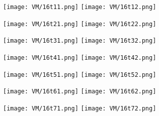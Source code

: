

\begin{figure}[h]
		\centering
		\texttt{[image: VM/16t11.png]}
		\texttt{[image: VM/16t12.png]}
\label{ris:image}
\end{figure}



\begin{figure}[h]
		\centering
		\texttt{[image: VM/16t21.png]}
		\texttt{[image: VM/16t22.png]}
\label{ris:image}
\end{figure}



\begin{figure}[h]
		\centering
		\texttt{[image: VM/16t31.png]}
		\texttt{[image: VM/16t32.png]}
\label{ris:image}
\end{figure}



\begin{figure}[h]
		\centering
		\texttt{[image: VM/16t41.png]}
		\texttt{[image: VM/16t42.png]}
\label{ris:image}
\end{figure}

\newpage



\begin{figure}[h]
		\centering
		\texttt{[image: VM/16t51.png]}
		\texttt{[image: VM/16t52.png]}
\label{ris:image}
\end{figure}



\begin{figure}[h]
		\centering
		\texttt{[image: VM/16t61.png]}
		\texttt{[image: VM/16t62.png]}
\label{ris:image}
\end{figure}



\begin{figure}[h]
		\centering
		\texttt{[image: VM/16t71.png]}
		\texttt{[image: VM/16t72.png]}
\label{ris:image}
\end{figure}

